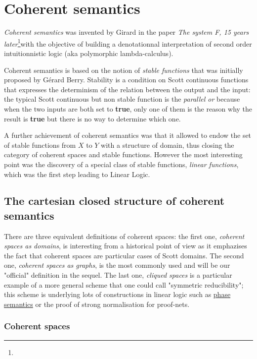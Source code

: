 \section{Coherent semantics}\label{coherent-semantics}

\emph{Coherent semantics} was invented by Girard in the paper \emph{The
system F, 15 years later}\footnote{}with the objective of building a
denotationnal interpretation of second order intuitionnistic logic (aka
polymorphic lambda-calculus).

Coherent semantics is based on the notion of \emph{stable functions}
that was initially proposed by Gérard Berry. Stability is a condition on
Scott continuous functions that expresses the determinism of the
relation between the output and the input: the typical Scott continuous
but non stable function is the \emph{parallel or} because when the two
inputs are both set to \textbf{true}, only one of them is the reason why
the result is \textbf{true} but there is no way to determine which one.

A further achievement of coherent semantics was that it allowed to endow
the set of stable functions from \(X\) to \(Y\) with a structure of
domain, thus closing the category of coherent spaces and stable
functions. However the most interesting point was the discovery of a
special class of stable functions, \emph{linear functions}, which was
the first step leading to Linear Logic.

\subsection{The cartesian closed structure of coherent
semantics}\label{the-cartesian-closed-structure-of-coherent-semantics}

There are three equivalent definitions of coherent spaces: the first
one, \emph{coherent spaces as domains}, is interesting from a historical
point of view as it emphazises the fact that coherent spaces are
particular cases of Scott domains. The second one, \emph{coherent spaces
as graphs}, is the most commonly used and will be our "official"
definition in the sequel. The last one, \emph{cliqued spaces} is a
particular example of a more general scheme that one could call
"symmetric reducibility"; this scheme is underlying lots of
constructions in linear logic such as \href{phase_semantics}{phase
semantics} or the proof of strong normalisation for proof-nets.

\subsubsection{Coherent spaces}\label{coherent-spaces}

